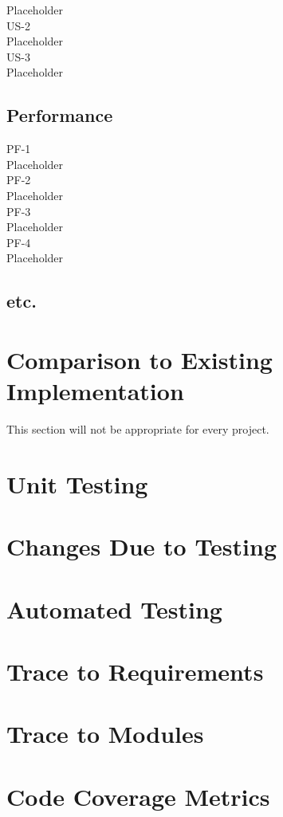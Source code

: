 \documentclass[12pt, titlepage]{article}
\begin{document}
Placeholder\\

US-2\\

Placeholder\\

US-3\\

Placeholder

\subsection{Performance}

PF-1\\

Placeholder\\

PF-2\\

Placeholder\\

PF-3\\

Placeholder\\

PF-4\\

Placeholder

\subsection{etc.}
	
\section{Comparison to Existing Implementation}	

This section will not be appropriate for every project.

\section{Unit Testing}

\section{Changes Due to Testing}

\section{Automated Testing}
		
\section{Trace to Requirements}
		
\section{Trace to Modules}		

\section{Code Coverage Metrics}
\end{document}
